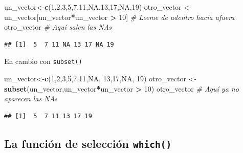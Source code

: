 \documentclass[
]{book}
\newenvironment{Shaded}{\begin{snugshade}}{\end{snugshade}}
\newcommand{\CommentTok}[1]{\textcolor[rgb]{0.56,0.35,0.01}{\textit{#1}}}
\newcommand{\ConstantTok}[1]{\textcolor[rgb]{0.56,0.35,0.01}{#1}}
\newcommand{\DecValTok}[1]{\textcolor[rgb]{0.00,0.00,0.81}{#1}}
\newcommand{\FunctionTok}[1]{\textcolor[rgb]{0.13,0.29,0.53}{\textbf{#1}}}
\newcommand{\NormalTok}[1]{#1}
\newcommand{\OtherTok}[1]{\textcolor[rgb]{0.56,0.35,0.01}{#1}}
\newcommand{\SpecialCharTok}[1]{\textcolor[rgb]{0.81,0.36,0.00}{\textbf{#1}}}
\begin{document}
\begin{Shaded}
\begin{Highlighting}[]
\NormalTok{un\_vector}\OtherTok{\textless{}{-}}\FunctionTok{c}\NormalTok{(}\DecValTok{1}\NormalTok{,}\DecValTok{2}\NormalTok{,}\DecValTok{3}\NormalTok{,}\DecValTok{5}\NormalTok{,}\DecValTok{7}\NormalTok{,}\DecValTok{11}\NormalTok{,}\ConstantTok{NA}\NormalTok{,}\DecValTok{13}\NormalTok{,}\DecValTok{17}\NormalTok{,}\ConstantTok{NA}\NormalTok{,}\DecValTok{19}\NormalTok{) }
\NormalTok{otro\_vector }\OtherTok{\textless{}{-}}\NormalTok{ un\_vector[un\_vector}\SpecialCharTok{*}\NormalTok{un\_vector }\SpecialCharTok{\textgreater{}} \DecValTok{10}\NormalTok{]   }\CommentTok{\# Leeme de adentro hacia afuera}
\NormalTok{otro\_vector  }\CommentTok{\# Aquí salen las NAs}
\end{Highlighting}
\end{Shaded}

\begin{verbatim}
## [1]  5  7 11 NA 13 17 NA 19
\end{verbatim}

En cambio con \texttt{subset()}

\begin{Shaded}
\begin{Highlighting}[]
\NormalTok{un\_vector}\OtherTok{\textless{}{-}}\FunctionTok{c}\NormalTok{(}\DecValTok{1}\NormalTok{,}\DecValTok{2}\NormalTok{,}\DecValTok{3}\NormalTok{,}\DecValTok{5}\NormalTok{,}\DecValTok{7}\NormalTok{,}\DecValTok{11}\NormalTok{,}\ConstantTok{NA}\NormalTok{, }\DecValTok{13}\NormalTok{,}\DecValTok{17}\NormalTok{,}\ConstantTok{NA}\NormalTok{, }\DecValTok{19}\NormalTok{) }
\NormalTok{otro\_vector }\OtherTok{\textless{}{-}} \FunctionTok{subset}\NormalTok{(un\_vector,un\_vector}\SpecialCharTok{*}\NormalTok{un\_vector }\SpecialCharTok{\textgreater{}} \DecValTok{10}\NormalTok{)   }
\NormalTok{otro\_vector  }\CommentTok{\# Aquí ya no aparecen las NAs}
\end{Highlighting}
\end{Shaded}

\begin{verbatim}
## [1]  5  7 11 13 17 19
\end{verbatim}

\subsection{\texorpdfstring{La función de selección \texttt{which()}}{La función de selección which()}}\label{la-funciuxf3n-de-selecciuxf3n-which}
\end{document}
